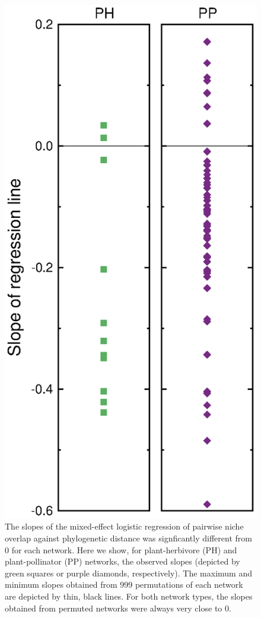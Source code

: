 \documentclass[12pt]{article}
\begin{document}
  \begin{figure}[!h]
    \begin{center}
      \centerline{\includegraphics*[width=.75\textwidth]{Figures/dataplots/observed_vs_random.eps}}
    \end{center}
     \caption{The slopes of the mixed-effect logistic regression of pairwise niche overlap against phylogenetic distance was signficantly different from 0 for each network. Here we show, for plant-herbivore (PH) and plant-pollinator (PP) networks, the observed slopes (depicted by green squares or purple diamonds, respectively). The maximum and minimum slopes obtained from 999 permutations of each network are depicted by thin, black lines. For both network types, the slopes obtained from permuted networks were always very close to 0.}
    \label{obs_vs_random} 
  \end{figure}
\end{document}
